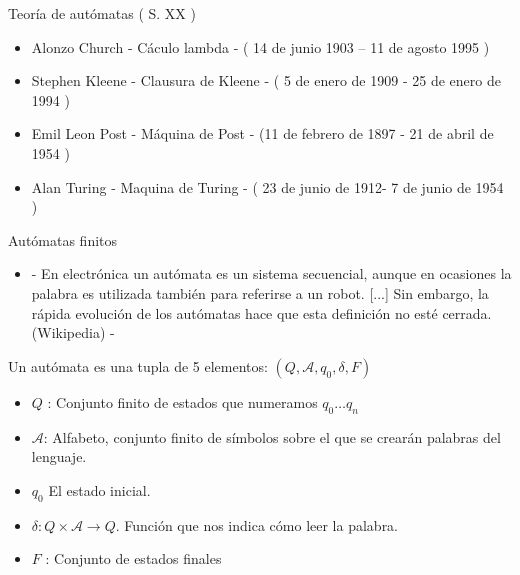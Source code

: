 \begin{frame}[fragile]{Teoría de autómatas ( S. XX )}

	\begin{itemize}
		\item Alonzo Church - Cáculo lambda - ( 14 de junio 1903 – 11 de agosto 1995 )
		\item Stephen Kleene - Clausura de Kleene - (  5 de enero de 1909 - 25 de enero de 1994 )
		\item  Emil Leon Post - Máquina de Post - (11 de febrero de 1897  - 21 de abril de 1954 )
		\item Alan Turing  - Maquina de Turing - ( 23 de junio de 1912- 7 de junio de 1954 )
	\end{itemize}


\end{frame}

\begin{frame}[fragile]{Autómatas finitos}

\begin{block}{ }
	\begin{itemize}
		\pause
		\item -  En electrónica un autómata es un sistema secuencial, aunque en ocasiones la palabra es
		utilizada también para referirse a un robot. [...] Sin embargo, la rápida evolución de los autómatas hace que esta definición no esté cerrada. (Wikipedia) -
	\end{itemize}
\end{block}
\pause 
Un autómata  es una tupla de 5 elementos: $(Q, \mathcal{A}, q_0, \delta, F)$

\begin{itemize}
	\item $Q$ : Conjunto finito de estados que numeramos $ q_0 \dots q_n$ \pause
	\item $\mathcal{A}$: Alfabeto, conjunto finito de símbolos sobre el que se crearán palabras del lenguaje. \pause
	\item $q_0$ El estado inicial. \pause
	\item $\delta :Q\times \mathcal{A} \rightarrow Q$. Función que nos indica cómo leer la palabra. \pause
	\item $F$ : Conjunto de estados finales
\end{itemize}


\end{frame}



